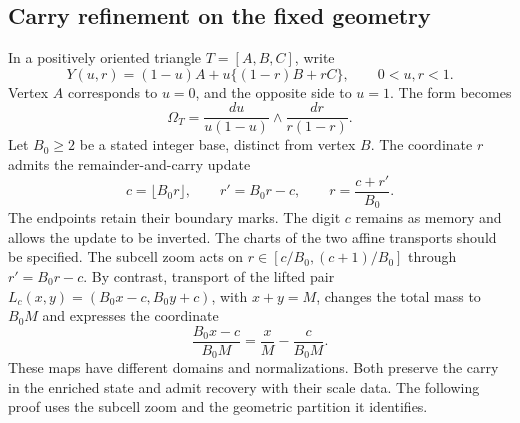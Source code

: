 \subsection{Carry refinement on the fixed geometry}

In a positively oriented triangle \(T=[A,B,C]\), write
\begin{equation}
 Y(u,r)=(1-u)A+u\{(1-r)B+rC\},\qquad 0<u,r<1.
 \label{eq:polygon-blowdown}
\end{equation}
Vertex \(A\) corresponds to \(u=0\), and the opposite side to
\(u=1\). The form becomes
\begin{equation}
 \Omega_T=\frac{du}{u(1-u)}\wedge\frac{dr}{r(1-r)}.
 \label{eq:polygon-product-form}
\end{equation}
Let \(B_0\geq2\) be a stated integer base, distinct from vertex
\(B\). The coordinate \(r\) admits the remainder-and-carry update
\begin{equation}
 c=\lfloor B_0r\rfloor,\qquad r'=B_0r-c,\qquad
 r=\frac{c+r'}{B_0}.
 \label{eq:polygon-carry}
\end{equation}
The endpoints retain their boundary marks. The digit \(c\) remains
as memory and allows the update to be inverted. The charts of the
two affine transports should be specified. The subcell zoom acts
on \(r\in[c/B_0,(c+1)/B_0]\) through \(r'=B_0r-c\).
By contrast, transport of the lifted pair
\(L_c(x,y)=(B_0x-c,B_0y+c)\), with \(x+y=M\), changes the
total mass to \(B_0M\) and expresses the coordinate
\[
 \frac{B_0x-c}{B_0M}=\frac{x}{M}-\frac{c}{B_0M}.
\]
These maps have different domains and normalizations. Both preserve
the carry in the enriched state and admit recovery with their scale
data. The following proof uses the subcell zoom and the geometric
partition it identifies.

